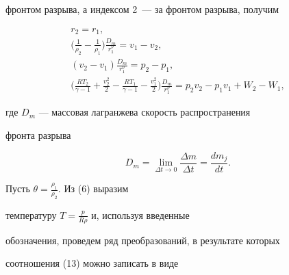 фронтом разрыва, а индексом 2~--- за фронтом разрыва, получим


\begin{gather}


r_{2} = r_{1},\tag{13.1}\\


%


\bigg(\frac {1} {\rho _{2}} - \frac {1} {\rho _{1}}\bigg)


\frac {D_{m}}{r_{1}^{\nu}} = v _{1} -v _{2},\tag{13.2}\\


%


( v _{2} - v _{1}) \frac


{D_{m}}{r_{1}^{\nu}} = p _{2} - p_{1},\tag{13.3}\\


%


\bigg(\frac {R T_{2}}{\gamma - 1} + \frac { v ^{2}


_{2}}{2} - \frac {R T_{1}}{\gamma - 1} - \frac { v ^{2}


_{1}}{2}\bigg) \frac {D_{m}}{r_{1}^{\nu}} = p_{2} v _{2} - p_{1}


 v _{1} + W_{2} - W_{1},\tag{13.4}


\end{gather}


\addtocounter{equation}{1}





\noindent{}где $D_{m}$ --- массовая лагранжева скорость распространения


фронта разрыва


\begin{equation}


D_{m} = \lim_{\Delta t \rightarrow 0} {\frac {\Delta


m}{\Delta t}} = \frac {dm_{j}}{dt}.


\end{equation}





Пусть $\theta = \frac {\rho_{1}}{\rho_{2}}$. Из (6) выразим


температуру $T = \frac {p}{R {\rho}}$ и, используя введенные


обозначения, проведем ряд преобразований, в результате которых


соотношения (13) можно записать в виде


